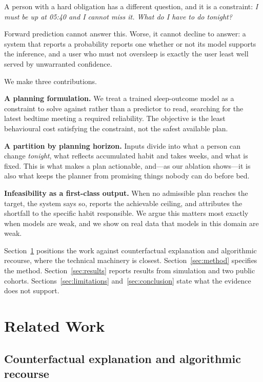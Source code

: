 \documentclass[conference]{IEEEtran}
\begin{document}
A person with a hard obligation has a different question, and it is a
constraint: \emph{I must be up at 05:40 and I cannot miss it. What do I have to
do tonight?}

Forward prediction cannot answer this. Worse, it cannot decline to answer: a
system that reports a probability reports one whether or not its model supports
the inference, and a user who must not oversleep is exactly the user least well
served by unwarranted confidence.

We make three contributions.

\textbf{A planning formulation.} We treat a trained sleep-outcome model as a
constraint to solve against rather than a predictor to read, searching for the
latest bedtime meeting a required reliability. The objective is the least
behavioural cost satisfying the constraint, not the safest available plan.

\textbf{A partition by planning horizon.} Inputs divide into what a person can
change \emph{tonight}, what reflects accumulated habit and takes weeks, and what
is fixed. This is what makes a plan actionable, and---as our ablation
shows---it is also what keeps the planner from promising things nobody can do
before bed.

\textbf{Infeasibility as a first-class output.} When no admissible plan reaches
the target, the system says so, reports the achievable ceiling, and attributes
the shortfall to the specific habit responsible. We argue this matters most
exactly when models are weak, and we show on real data that models in this
domain are weak.

Section~\ref{sec:related} positions the work against counterfactual explanation
and algorithmic recourse, where the technical machinery is closest.
Section~\ref{sec:method} specifies the method. Section~\ref{sec:results} reports
results from simulation and two public cohorts. Sections~\ref{sec:limitations}
and~\ref{sec:conclusion} state what the evidence does not support.

\section{Related Work}
\label{sec:related}

\subsection{Counterfactual explanation and algorithmic recourse}
\end{document}
